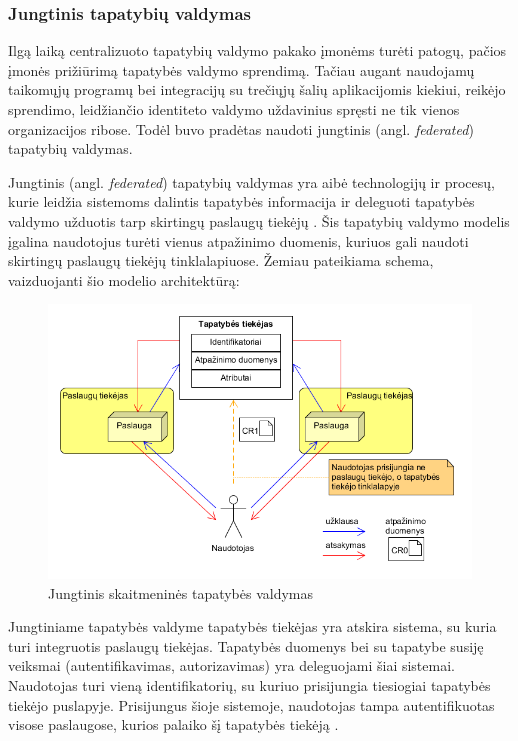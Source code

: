 \subsubsection{Jungtinis tapatybių valdymas}



Ilgą laiką centralizuoto tapatybių valdymo pakako įmonėms turėti patogų, pačios įmonės prižiūrimą tapatybės valdymo sprendimą. Tačiau augant 
naudojamų taikomųjų programų bei integracijų su trečiųjų šalių aplikacijomis kiekiui, reikėjo sprendimo, leidžiančio identiteto valdymo uždavinius
spręsti ne tik vienos organizacijos ribose. Todėl buvo pradėtas naudoti jungtinis (angl. \textit{federated}) tapatybių valdymas.

Jungtinis (angl. \textit{federated}) tapatybių valdymas yra aibė technologijų
ir procesų, kurie leidžia sistemoms dalintis tapatybės informacija ir deleguoti tapatybės valdymo užduotis
tarp skirtingų paslaugų tiekėjų \cite{Maler2008}. Šis tapatybių valdymo modelis įgalina naudotojus turėti vienus atpažinimo duomenis,
kuriuos gali naudoti skirtingų paslaugų tiekėjų tinklalapiuose. Žemiau pateikiama schema, vaizduojanti
šio modelio architektūrą:

\begin{figure}[H]
    \centering
    \includegraphics[scale=0.7]{img/federatedModel}
    \caption{Jungtinis skaitmeninės tapatybės valdymas \cite{Cao2010}}
    \label{fig:federatedModel}
\end{figure}

Jungtiniame tapatybės valdyme tapatybės tiekėjas yra atskira sistema, su kuria turi integruotis paslaugų tiekėjas. Tapatybės
duomenys bei su tapatybe susiję veiksmai (autentifikavimas, autorizavimas) yra deleguojami šiai sistemai. Naudotojas turi vieną identifikatorių,
su kuriuo prisijungia tiesiogiai tapatybės tiekėjo puslapyje. Prisijungus šioje sistemoje, naudotojas tampa
autentifikuotas visose paslaugose, kurios palaiko šį tapatybės tiekėją \cite{Maler2008}.


